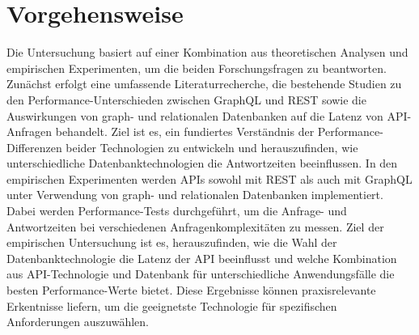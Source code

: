 \section{Vorgehensweise} %
\label{sec:vorgehensweise}
Die Untersuchung basiert auf einer Kombination aus theoretischen Analysen und empirischen Experimenten, um die beiden Forschungsfragen zu beantworten. Zunächst erfolgt eine umfassende Literaturrecherche, die bestehende Studien zu den Performance-Unterschieden zwischen GraphQL und REST sowie die Auswirkungen von graph- und relationalen Datenbanken auf die Latenz von API-Anfragen behandelt. Ziel ist es, ein fundiertes Verständnis der Performance-Differenzen beider Technologien zu entwickeln und herauszufinden, wie unterschiedliche Datenbanktechnologien die Antwortzeiten beeinflussen.
In den empirischen Experimenten werden APIs sowohl mit REST als auch mit GraphQL unter Verwendung von graph- und relationalen Datenbanken implementiert. Dabei werden Performance-Tests durchgeführt, um die Anfrage- und Antwortzeiten bei verschiedenen Anfragenkomplexitäten zu messen. Ziel der empirischen Untersuchung ist es, herauszufinden, wie die Wahl der Datenbanktechnologie die Latenz der API beeinflusst und welche Kombination aus API-Technologie und Datenbank für unterschiedliche Anwendungsfälle die besten Performance-Werte bietet. Diese Ergebnisse können praxisrelevante Erkentnisse liefern, um die geeignetste Technologie für spezifischen Anforderungen auszuwählen.
